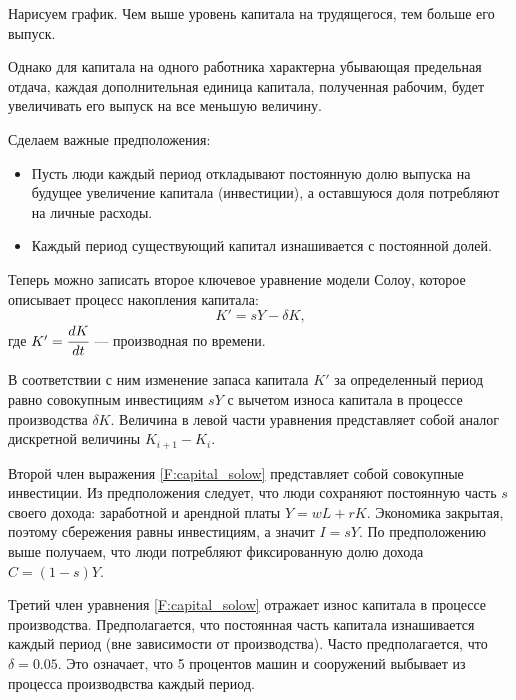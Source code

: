Нарисуем график.
Чем выше уровень капитала на трудящегося, тем больше его выпуск.

\begin{center}
\end{center}
Однако для капитала на одного работника характерна убывающая предельная отдача, каждая дополнительная единица капитала, полученная рабочим, будет увеличивать его выпуск на все меньшую величину.

Сделаем важные предположения:
\begin{itemize}
	\item Пусть люди каждый период откладывают постоянную долю выпуска на будущее увеличение капитала (инвестиции), а оставшуюся доля потребляют на личные расходы.
	\item Каждый период существующий капитал  изнашивается с постоянной долей.
\end{itemize}
Теперь можно записать второе ключевое уравнение модели Солоу, которое описывает процесс накопления капитала:
\begin{equation}
K' = sY-\delta K \text{,}
\label{F:capital_solow}
\end{equation}
где $K' = \cfrac{dK}{dt}$ --- производная по времени.

В соответствии с ним изменение запаса капитала $K'$ за определенный период равно совокупным инвестициям $sY$ с вычетом износа капитала в процессе производства $\delta K$.
Величина в левой части уравнения представляет собой аналог дискретной величины $K_{i+1} - K_{i}$.

Второй член выражения \ref {F:capital_solow} представляет собой совокупные инвестиции.
Из предположения следует, что люди сохраняют постоянную часть $s$ своего дохода: заработной и арендной платы $Y=wL+rK$.
Экономика закрытая, поэтому сбережения равны инвестициям, а значит $I=sY$.
По предположению выше получаем, что люди потребляют фиксированную долю дохода $C=(1-s)Y$.

Третий член уравнения \ref {F:capital_solow} отражает износ капитала в процессе производства.
Предполагается, что постоянная часть капитала изнашивается каждый период (вне зависимости от производства).
Часто предполагается, что $\delta = 0.05$.
Это означает, что 5 процентов машин и сооружений выбывает из процесса производвства каждый период.

